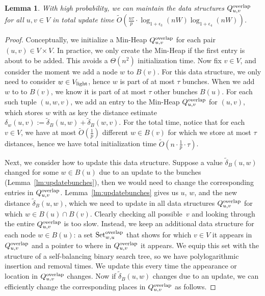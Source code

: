 \documentclass[11pt]{article}
\newtheorem{lemma}[theorem]{Lemma}
\theoremstyle{definition}
\theoremstyle{remark}
\begin{document}
\begin{lemma}\label{lm:min_heap_w}
   With high probability, we can maintain the data structures $Q^{\rm{overlap}}_{u,v}$ for all $u,v\in V$ in total update time $\tilde O (\tfrac{n\tau }{p} \cdot\log_{1+\epsilon_3}(nW)\log_{1+\epsilon_4}(nW)) $.
\end{lemma}
\begin{proof}
    Conceptually, we initialize a Min-Heap $Q^{\rm{overlap}}_{u,v}$ for each pair $(u,v)\in V\times V$. In practice, we only create the Min-Heap if the first entry is about to be added. This avoids a $\Theta(n^2)$ initialization time. Now fix $v\in V$, and consider the moment we add a node $w$ to $B(v)$. For this data structure, we only need to consider $w\in V_{\rm{light}}$, hence $w$ is part of at most $ \tau $ bunches. When we add $w$ to to $B(v)$, we know it is part of at most $\tau$ other bunches $B(u)$. For each such tuple $(u,w,v)$, we add an entry to the Min-Heap $Q^{\rm{overlap}}_{u,v}$ for $(u,v)$, which stores $w$ with as key the distance estimate $\delta_w(u,v):=\tilde\delta_B(u,w)+\tilde\delta_B(w,v)$. For the total time, notice that for each $v\in V$, we have at most $\tilde O(\tfrac{1}{p})$ different $w\in B(v)$ for which we store at most $\tau$ distances, hence we have total initialization time $ \tilde O (n \cdot \tfrac{1}{p} \cdot \tau) $.
    
    Next, we consider how to update this data structure. Suppose a value $\tilde\delta_B(u,w)$ changed for some $w\in B(u)$ due to an update to the bunches (Lemma~\ref{lm:updatebunches}), then we would need to change the corresponding entries in $Q^{\rm{overlap}}_{u,v}$. Lemma~\ref{lm:updatebunches} gives us $u$, $w$, and the new distance $\tilde \delta_B(u,w)$, which we need to update in all data structures $Q^{\rm{overlap}}_{u,v}$ for which $w\in B(u) \cap B(v)$. Clearly checking all possible~$v$ and looking through the entire $Q^{\rm{overlap}}_{u,v}$ is too slow. Instead, we keep an additional data structure for each node $w\in B(u)$: a set $\text{Set}_{w,u}^{\rm{overlap}}$ that shows for which $v\in V$ it appears in $Q^{\rm{overlap}}_{u,v}$ and a pointer to where in $Q^{\rm{overlap}}_{u,v}$ it appears. We equip this set with the structure of a self-balancing binary search tree, so we have polylogarithmic insertion and removal times. We update this every time the appearance or location in $Q^{\rm{overlap}}_{u,v}$ changes. Now if $\tilde\delta_B(u,w)$ changes due to an update, we can efficiently change the corresponding places in $Q^{\rm{overlap}}_{u,v}$ as follows. 
    

\end{proof}
\end{document}
